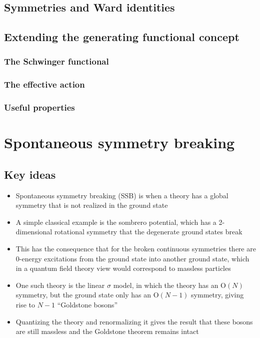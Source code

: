 \documentclass[12pt]{memoir}
\begin{document}
\section{Symmetries and Ward identities}

\section{Extending the generating functional concept}

\subsection{The Schwinger functional}

\subsection{The effective action}

\subsection{Useful properties}

\chapter{Spontaneous symmetry breaking}

\section{Key ideas}

\begin{itemize}
  \item Spontaneous symmetry breaking (SSB) is when a theory has a global symmetry
    that is not realized in the ground state
  \item A simple classical example is the sombrero potential,
    which has a 2-dimensional rotational symmetry that the degenerate ground states break
  \item This has the consequence that for the broken continuous symmetries
    there are 0-energy excitations from the ground state into another ground state,
    which in a quantum field theory view would correspond to massless particles
  \item One such theory is the linear $\sigma$ model,
    in which the theory has an $\text{O}(N)$ symmetry,
    but the ground state only has an $\text{O}(N-1)$ symmetry,
    giving rise to $N-1$ ``Goldstone bosons''
  \item Quantizing the theory and renormalizing it gives the result that
    these bosons are still massless and the Goldstone theorem remains intact
\end{itemize}
\end{document}
